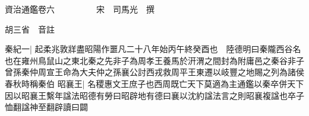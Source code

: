 






























































資治通鑑卷六　　　　　宋　司馬光　撰

胡三省　音註

秦紀一|{
	起柔兆敦牂盡昭陽作噩凡二十八年始丙午終癸酉也　陸德明曰秦隴西谷名也在雍州鳥鼠山之東北秦之先非子為周孝王養馬於汧渭之間封為附庸邑之秦谷非子曾孫秦仲周宣王命為大夫仲之孫襄公討西戎救周平王東遷以岐豐之地賜之列為諸侯春秋時稱秦伯}
昭襄王|{
	名稷惠文王庶子也西周既亡天下莫適為主通鑑以秦卒併天下因以昭襄王繫年諡法昭德有勞曰昭辟地有德曰襄以沈約諡法言之則昭襄複諡也卒子恤翻諡神至翻辟讀曰闢}


